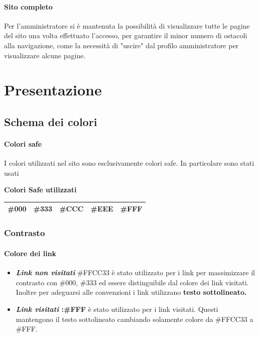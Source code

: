 \documentclass[12pt,a4paper]{article}
\begin{document}
\paragraph{Sito completo} Per l'amministratore si è mantenuta la possibilità di visualizzare tutte le pagine del sito una volta effettuato l'accesso, per garantire il minor numero di ostacoli alla navigazione, come la necessità di "uscire" dal profilo amministratore per visualizzare alcune pagine.

\section{Presentazione}
\subsection{Schema dei colori}
\paragraph{Colori safe}
I colori utilizzati nel sito sono esclusivamente colori safe. In particolare sono stati usati
\begin{center}
	\textbf{Colori Safe utilizzati}
	
	\begin{tabular}{c c c c c}
		\midrule  \#000 & \#333 & \#CCC & \#EEE  &  \#FFF \\ \midrule 
	\end{tabular} 
\end{center}
\subsubsection{Contrasto}
\paragraph{Colore dei link}
\begin{itemize}
	\item \textit{\textbf{Link non visitati}} \#FFCC33 è stato utilizzato per i link per massimizzare il contrasto con \#000, \#333 ed essere distinguibile dal colore dei link visitati. Inoltre per adeguarsi alle convenzioni i link utilizzano \textbf{testo sottolineato.}
	\item \textbf{\textit{Link visitati} :\#FFF }è stato utilizzato per i link visitati. Questi mantengono il testo sottolineato cambiando solamente colore da \#FFCC33 a \#FFF. 
\end{itemize}
\end{document}
